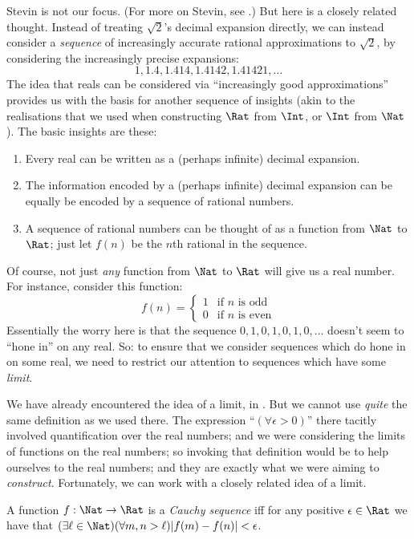 \documentclass[../../../include/open-logic-section]{subfiles}
\begin{document}
Stevin is not our focus. (For more on Stevin, see
\citealt{KatzKatz2012}.) But here is a closely related thought.
Instead of treating $\sqrt{2}$'s decimal expansion directly, we can
instead consider a  \emph{sequence} of increasingly accurate rational
approximations to $\sqrt{2}$, by considering the increasingly precise
expansions: 
\[
1, 1.4, 1.414, 1.4142, 1.41421,\ldots
\]
The idea that reals can be considered via ``increasingly good
approximations'' provides us with the basis for another sequence of
insights (akin to the realisations that we used when constructing
$\Rat$ from $\Int$, or $\Int$ from $\Nat$). The basic insights are
these:
\begin{enumerate}
	\item Every real can be written as a (perhaps infinite) decimal
	expansion.
	\item The information encoded by a (perhaps infinite) decimal
	expansion can be equally be encoded by a sequence of rational
	numbers.
	\item A sequence of rational numbers can be thought of as a
	function from $\Nat$ to $\Rat$; just let $f(n)$ be the $n$th
	rational in the sequence.
\end{enumerate}
Of course, not just \emph{any} function from $\Nat$ to $\Rat$ will
give us a real number. For instance, consider this function:
\[
	f(n) =\begin{cases}
			1 & \text{if }n\text{ is odd}\\
			0 &\text{if }n\text{ is even}
		\end{cases}
\]
Essentially the worry here is that the sequence $0,1,0,1,0,1,0,\ldots$
doesn't seem to ``hone in'' on any real. So: to ensure that we
consider sequences which do hone in on some real, we need to restrict
our attention to sequences which have some \emph{limit}. 

We have already encountered the idea of a limit, in
. But we cannot use \emph{quite} the same
definition as we used there. The expression ``$(\forall \epsilon>0)$''
there tacitly involved quantification over the real numbers; and we
were considering the limits of functions on the real numbers; so
invoking that definition would be to help ourselves to the real
numbers; and they are exactly what we were aiming to \emph{construct}.
Fortunately, we can work with a closely related idea of a limit. 
\begin{defn}
  A function $f: \Nat \to \Rat$ is a \emph{Cauchy sequence} iff for
  any positive $\epsilon \in \Rat$ we have that $(\exists \ell \in
  \Nat)(\forall m, n > \ell)|f(m) - f(n)| < \epsilon$.
\end{defn}
\end{document}
